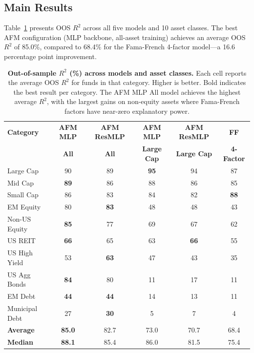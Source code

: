 \subsection{Main Results}\label{sec:main_results}

Table~\ref{tab:main_results} presents OOS $R^2$ across all five models and 10 asset classes. The best AFM configuration (MLP backbone, all-asset training) achieves an average OOS $R^2$ of 85.0\%, compared to 68.4\% for the Fama-French 4-factor model---a 16.6 percentage point improvement.

\begin{table}[t]
\centering
\caption{\textbf{Out-of-sample $R^2$ (\%) across models and asset classes.} Each cell reports the average OOS $R^2$ for funds in that category. Higher is better. Bold indicates the best result per category. The AFM MLP All model achieves the highest average $R^2$, with the largest gains on non-equity assets where Fama-French factors have near-zero explanatory power.}
\label{tab:main_results}
\small
\begin{tabular}{lccccc}
\toprule
\textbf{Category} & \textbf{AFM MLP} & \textbf{AFM ResMLP} & \textbf{AFM MLP} & \textbf{AFM ResMLP} & \textbf{FF} \\
 & \textbf{All} & \textbf{All} & \textbf{Large Cap} & \textbf{Large Cap} & \textbf{4-Factor} \\
\midrule
Large Cap       & 90 & 89 & \textbf{95} & 94 & 87 \\
Mid Cap         & \textbf{89} & 86 & 88 & 86 & 85 \\
Small Cap       & 86 & 83 & 84 & 82 & \textbf{88} \\
EM Equity       & 80 & \textbf{83} & 48 & 48 & 43 \\
Non-US Equity   & \textbf{85} & 77 & 69 & 67 & 62 \\
US REIT         & \textbf{66} & 65 & 63 & \textbf{66} & 55 \\
US High Yield   & 53 & \textbf{63} & 47 & 43 & 35 \\
US Agg Bonds    & \textbf{84} & 80 & 11 & 17 & 11 \\
EM Debt         & \textbf{44} & \textbf{44} & 14 & 13 & 11 \\
Municipal Debt  & 27 & \textbf{30} & 5 & 7 & 4 \\
\midrule
\textbf{Average}  & \textbf{85.0} & 82.7 & 73.0 & 70.7 & 68.4 \\
\textbf{Median}   & \textbf{88.1} & 85.4 & 86.0 & 81.5 & 75.4 \\
\bottomrule
\end{tabular}
\end{table}

